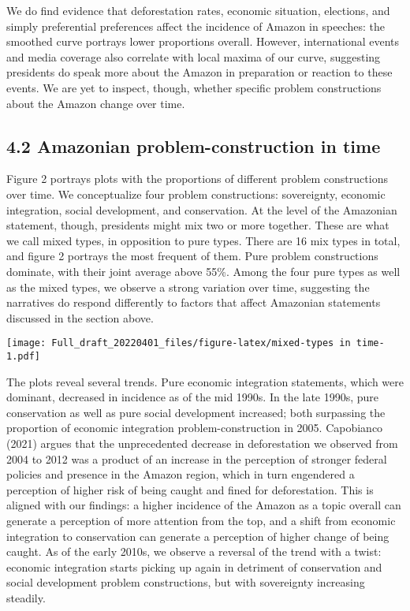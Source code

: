 \documentclass[
]{article}
\begin{document}
We do find evidence that deforestation rates, economic situation,
elections, and simply preferential preferences affect the incidence of
Amazon in speeches: the smoothed curve portrays lower proportions
overall. However, international events and media coverage also correlate
with local maxima of our curve, suggesting presidents do speak more
about the Amazon in preparation or reaction to these events. We are yet
to inspect, though, whether specific problem constructions about the
Amazon change over time.

\hypertarget{amazonian-problem-construction-in-time}{%
\subsection{4.2 Amazonian problem-construction in
time}\label{amazonian-problem-construction-in-time}}

Figure 2 portrays plots with the proportions of different problem
constructions over time. We conceptualize four problem constructions:
sovereignty, economic integration, social development, and conservation.
At the level of the Amazonian statement, though, presidents might mix
two or more together. These are what we call mixed types, in opposition
to pure types. There are 16 mix types in total, and figure 2 portrays
the most frequent of them. Pure problem constructions dominate, with
their joint average above 55\%. Among the four pure types as well as the
mixed types, we observe a strong variation over time, suggesting the
narratives do respond differently to factors that affect Amazonian
statements discussed in the section above.

\texttt{[image: Full\_draft\_20220401\_files/figure-latex/mixed-types in time-1.pdf]}

The plots reveal several trends. Pure economic integration statements,
which were dominant, decreased in incidence as of the mid 1990s. In the
late 1990s, pure conservation as well as pure social development
increased; both surpassing the proportion of economic integration
problem-construction in 2005. Capobianco (2021) argues that the
unprecedented decrease in deforestation we observed from 2004 to 2012
was a product of an increase in the perception of stronger federal
policies and presence in the Amazon region, which in turn engendered a
perception of higher risk of being caught and fined for deforestation.
This is aligned with our findings: a higher incidence of the Amazon as a
topic overall can generate a perception of more attention from the top,
and a shift from economic integration to conservation can generate a
perception of higher change of being caught. As of the early 2010s, we
observe a reversal of the trend with a twist: economic integration
starts picking up again in detriment of conservation and social
development problem constructions, but with sovereignty increasing
steadily.
\end{document}
